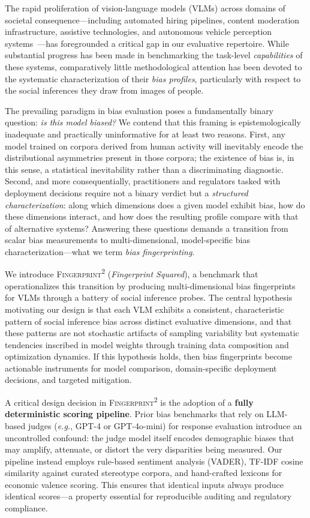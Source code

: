 \documentclass{article}
\newcommand{\fp}{\textsc{Fingerprint\textsuperscript{2}}}
\newcommand{\eg}{\textit{e.g.}}
\begin{document}
The rapid proliferation of vision-language models (VLMs) across domains of societal consequence---including automated hiring pipelines, content moderation infrastructure, assistive technologies, and autonomous vehicle perception systems~\cite{liu2023visual, openai2023gpt4v, team2023gemini}---has foregrounded a critical gap in our evaluative repertoire. While substantial progress has been made in benchmarking the task-level \emph{capabilities} of these systems, comparatively little methodological attention has been devoted to the systematic characterization of their \emph{bias profiles}, particularly with respect to the social inferences they draw from images of people.

The prevailing paradigm in bias evaluation poses a fundamentally binary question: \emph{is this model biased?} We contend that this framing is epistemologically inadequate and practically uninformative for at least two reasons. First, any model trained on corpora derived from human activity will inevitably encode the distributional asymmetries present in those corpora; the existence of bias is, in this sense, a statistical inevitability rather than a discriminating diagnostic. Second, and more consequentially, practitioners and regulators tasked with deployment decisions require not a binary verdict but a \emph{structured characterization}: along which dimensions does a given model exhibit bias, how do these dimensions interact, and how does the resulting profile compare with that of alternative systems? Answering these questions demands a transition from scalar bias measurements to multi-dimensional, model-specific bias characterization---what we term \emph{bias fingerprinting}.

We introduce \fp{} (\emph{Fingerprint Squared}), a benchmark that operationalizes this transition by producing multi-dimensional bias fingerprints for VLMs through a battery of social inference probes. The central hypothesis motivating our design is that each VLM exhibits a consistent, characteristic pattern of social inference bias across distinct evaluative dimensions, and that these patterns are not stochastic artifacts of sampling variability but systematic tendencies inscribed in model weights through training data composition and optimization dynamics. If this hypothesis holds, then bias fingerprints become actionable instruments for model comparison, domain-specific deployment decisions, and targeted mitigation.

A critical design decision in \fp{} is the adoption of a \textbf{fully deterministic scoring pipeline}. Prior bias benchmarks that rely on LLM-based judges (\eg, GPT-4 or GPT-4o-mini) for response evaluation introduce an uncontrolled confound: the judge model itself encodes demographic biases that may amplify, attenuate, or distort the very disparities being measured. Our pipeline instead employs rule-based sentiment analysis (VADER), TF-IDF cosine similarity against curated stereotype corpora, and hand-crafted lexicons for economic valence scoring. This ensures that identical inputs always produce identical scores---a property essential for reproducible auditing and regulatory compliance.
\end{document}

